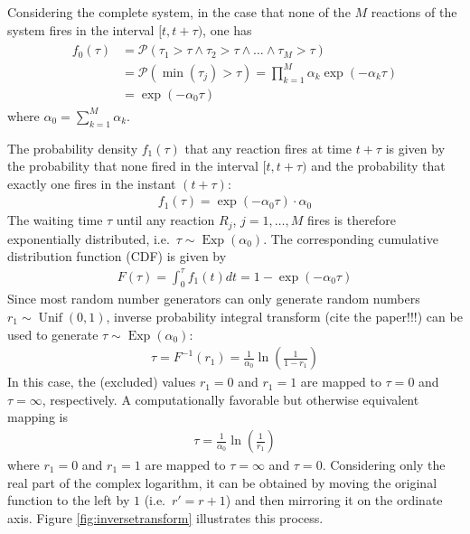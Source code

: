 Considering the complete system, in the case that none of the $M$ reactions of the system fires in the interval $\lbrack t,t + \tau)$, one has
\begin{align}
\begin{split}
f_0(\tau) &= \mathcal{P}(\tau_1 > \tau \wedge \tau_2 > \tau \wedge \ldots \wedge \tau_M > \tau) \\ 
&= \mathcal{P}(\min (\tau_j) > \tau) = \prod_{k=1}^M \alpha_k\exp(-\alpha_k \tau) \\ 
&= \exp(-\alpha_0 \tau)
\end{split}
\end{align}
where $\alpha_0 = \sum_{k=1}^M \alpha_k$. 

The probability density $f_1(\tau)$ that any reaction fires at time $t+\tau$ is given by the probability that none fired in the interval $\lbrack t,t+\tau)$ and the probability that exactly one fires in the instant $(t+\tau)$:
\begin{align}
f_1(\tau) = \exp(-\alpha_0 \tau) \cdot \alpha_0
\end{align}
The waiting time $\tau$ until any reaction $R_j$, $j=1,\ldots,M$ fires is therefore exponentially distributed, i.e.\ $\tau \sim \operatorname{Exp}(\alpha_0)$. The corresponding cumulative distribution function (CDF) is given by
\begin{align}
F(\tau) = \int_0^\tau f_1(t) dt = 1 - \exp(-\alpha_0 \tau)
\end{align}
Since most random number generators can only generate random numbers $r_1 \sim \operatorname{Unif}(0,1)$, inverse probability integral transform (cite the paper!!!) can be used to generate $\tau \sim \operatorname{Exp}(\alpha_0)$:
\begin{align}
\tau = F^{-1}(r_1) = \frac{1}{\alpha_0} \ln\left(\frac{1}{1-r_1}\right)
\end{align}
In this case, the (excluded) values $r_1=0$ and $r_1 = 1$ are mapped to $\tau = 0$ and $\tau = \infty$, respectively. A computationally favorable but otherwise equivalent mapping is
\begin{align}
\tau = \frac{1}{\alpha_0} \ln \left( \frac{1}{r_1} \right)
\end{align}
where $r_1=0$ and $r_1=1$ are mapped to $\tau = \infty$ and $\tau = 0$. Considering only the real part of the complex logarithm, it can be obtained by moving the original function to the left by $1$ (i.e.\ $r'=r+1$) and then mirroring it on the ordinate axis. Figure \ref{fig:inversetransform} illustrates this process. 

